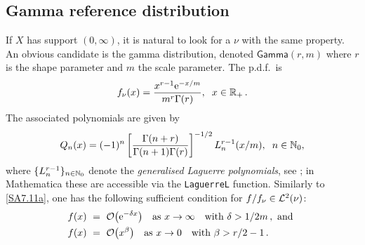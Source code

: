 \subsection{Gamma reference distribution}\label{SS:GammaNu}
If $X$ has support $(0,\infty)$, it is natural to look for a $\nu$ with the same property.
An obvious candidate is the
gamma distribution, denoted $\mathsf{Gamma}(r,m)$ where $r$ is the shape parameter
and $m$ the scale parameter.
The p.d.f.\ is
\begin{equation} \label{GammaPDF}
f_{\nu}(x)=\frac{x^{r-1} \mathrm{e}^{-x/m}}{m^{r}\Gamma(r)},\hspace{0.2cm}x\in \mathbb{R}_+ \,.
\end{equation}
The associated polynomials are given by
\begin{equation} \label{OrthogonalPolynomialGammaDistribution}
Q_{n}(x)=(-1)^{n}\left[\frac{\Gamma(n+r)}{\Gamma(n+1)\Gamma(r)}\right]^{-1/2}L_{n}^{r-1}(x/m),\hspace{0.2cm} n\in\mathbb{N}_0,
\end{equation}
where $\{L^{r-1}_{n}\}_{n\in\mathbb{N}_0}$ denote the \emph{generalised Laguerre polynomials}, see \cite{Szegoe1939}; in Mathematica these are accessible via the \texttt{LaguerreL} function.
Similarly to \eqref{SA7.11a}, one has the following sufficient condition for $f/f_\nu\in\mathcal{L}^2(\nu)$:
\begin{gather}\begin{split}\label{SA7.11b}
f(x)\ &=\ {\mathcal{O}}\big(\mathrm{e}^{-\delta x}\big)\quad\text{as }x\to\infty\quad\text{with } \delta>1/2m\,, \text{ and }\\
f(x)\ &=\ {\mathcal{O}}\big(x^\beta\big)\quad\text{as }x\to 0\quad\text{with }\beta>r/2-1\,.
\end{split}\end{gather}

